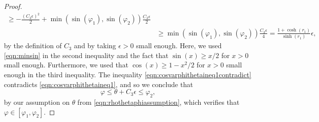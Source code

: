 \documentclass[a4paper,12pt]{article}
\begin{document}
\begin{proof}
\begin{align}
\geq  -\frac{(C_3 \epsilon)^2}{2}+\min(\sin(\varphi_1),\sin(\varphi_2))\frac{C_3\epsilon}{2} \nonumber \\
& \geq \min(\sin(\varphi_1),\sin(\varphi_2))\frac{C_3 \epsilon}{4}
=\frac{1+\cosh(r_1)}{\sinh(r_1)}\epsilon, \nonumber
\end{align}
by the definition of $C_3$ and by taking $\epsilon>0$ small enough. 
Here, we used \eqref{eqn:minsin} in the second inequality
and the fact that $\sin(x)\geq x/2$ for $x>0$ small enough. Furthermore, 
we used that $\cos(x)\geq 1-x^2/2$ for $x>0$ small enough in the third inequality. 
The inequality \eqref{eqn:cosvarphithetaineq1contradict} contradicts 
\eqref{eqn:cosvarphithetaineq1}, and so we conclude that 
\begin{equation} \label{eqn:varphiupperbound}
\varphi\leq \theta+C_3\epsilon
\leq \varphi_2,
\end{equation}
by our assumption on $\theta$ from \eqref{eqn:rhothetaphiassumption},
which verifies that $\varphi\in[\varphi_1,\varphi_2].$



\end{proof}
\end{document}
